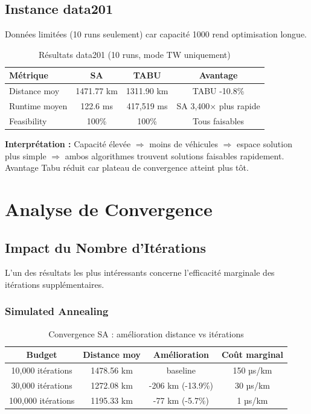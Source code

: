 \documentclass[12pt,a4paper,twoside]{report}
\begin{document}
\subsection{Instance data201}

Données limitées (10 runs seulement) car capacité 1000 rend optimisation
longue.

\begin{table}[H]
    \centering
    \caption{Résultats data201 (10 runs, mode TW uniquement)}
    \begin{tabular}{|l|c|c|c|}
        \hline
        \textbf{Métrique} & \textbf{SA} & \textbf{TABU} & \textbf{Avantage}     \\
        \hline
        Distance moy      & 1471.77 km  & 1311.90 km    & TABU -10.8\%          \\
        Runtime moyen     & 122.6 ms    & 417,519 ms    & SA 3,400× plus rapide \\
        Feasibility       & 100\%       & 100\%         & Tous faisables        \\
        \hline
    \end{tabular}
\end{table}

\textbf{Interprétation :} Capacité élevée $\Rightarrow$ moins de véhicules $\Rightarrow$ espace solution plus simple $\Rightarrow$ ambos algorithmes trouvent solutions faisables rapidement. Avantage Tabu réduit car plateau de convergence atteint plus tôt.

\section{Analyse de Convergence}

\subsection{Impact du Nombre d'Itérations}

L'un des résultats les plus intéressants concerne l'efficacité marginale des
itérations supplémentaires.

\subsubsection{Simulated Annealing}

\begin{table}[H]
    \centering
    \caption{Convergence SA : amélioration distance vs itérations}
    \begin{tabular}{|c|c|c|c|}
        \hline
        \textbf{Budget}    & \textbf{Distance moy} & \textbf{Amélioration} & \textbf{Coût marginal} \\
        \hline
        10,000 itérations  & 1478.56 km            & baseline              & 150 µs/km              \\
        30,000 itérations  & 1272.08 km            & -206 km (-13.9\%)     & 30 µs/km               \\
        100,000 itérations & 1195.33 km            & -77 km (-5.7\%)       & 1 µs/km                \\
        \hline
    \end{tabular}
\end{table}
\end{document}
